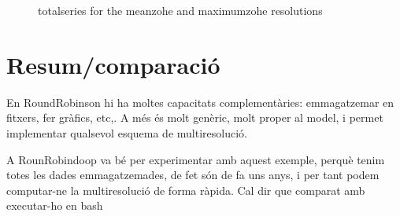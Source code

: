 


\begin{figure}[tp]
  \centering
  
  \caption{totalseries for the meanzohe and maximumzohe
    resolutions}
  \label{fig:exemple:4mrdtot}
\end{figure}





\section{Resum/comparació}


En RoundRobinson hi ha moltes capacitats complementàries: emmagatzemar en fitxers, fer gràfics, etc,. A més és molt genèric, molt proper al model, i permet implementar qualsevol esquema de multiresolució.


A RounRobindoop va bé per experimentar amb aquest exemple, perquè tenim totes les dades emmagatzemades, de fet són de fa uns anys, i per tant podem computar-ne la multiresolució de forma ràpida.
Cal dir que comparat amb executar-ho en bash












